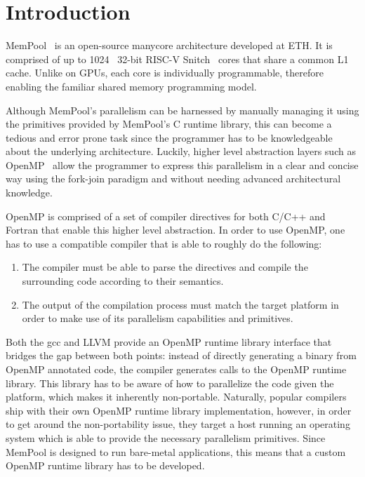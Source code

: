 \chapter{Introduction} \label{ch:introduction}

MemPool~\cite{mempool} is an open-source manycore architecture developed at ETH. It is comprised of
up to 1024~\cite{terapool} 32-bit RISC-V Snitch~\cite{snitch} cores that share a common L1 cache.
Unlike on GPUs, each core is individually programmable, therefore enabling the familiar shared
memory programming model.

Although MemPool's parallelism can be harnessed by manually managing it using the primitives
provided by MemPool's C runtime library, this can become a tedious and error prone task since the
programmer has to be knowledgeable about the underlying architecture. Luckily, higher level
abstraction layers such as OpenMP~\cite{openmp} allow the programmer to express this parallelism in
a clear and concise way using the fork-join paradigm and without needing advanced architectural
knowledge.

OpenMP is comprised of a set of compiler directives for both C/C++ and Fortran that enable this
higher level abstraction. In order to use OpenMP, one has to use a compatible compiler that is able
to roughly do the following:

\begin{enumerate}
	\item The compiler must be able to parse the directives and compile the surrounding code
	      according to their semantics.
	\item The output of the compilation process must match the target platform in order to make use
	      of its parallelism capabilities and primitives.
\end{enumerate}

Both the \gls{gcc} and LLVM provide an OpenMP runtime library interface that bridges the gap between
both points: instead of directly generating a binary from OpenMP annotated code, the compiler
generates calls to the OpenMP runtime library. This library has to be aware of how to parallelize
the code given the platform, which makes it inherently non-portable. Naturally, popular compilers
ship with their own OpenMP runtime library implementation, however, in order to get around the
non-portability issue, they target a host running an operating system which is able to provide the
necessary parallelism primitives. Since MemPool is designed to run bare-metal applications, this
means that a custom OpenMP runtime library has to be developed.

